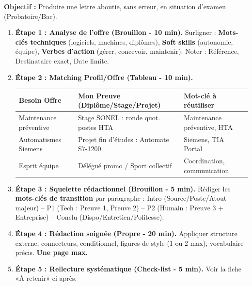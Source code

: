 \documentclass[11pt]{article}
\begin{document}
\begin{methode}
    \textbf{Objectif :} Produire une lettre aboutie, sans erreur, en situation d'examen (Probatoire/Bac).
    \begin{enumerate}
        \item \textbf{Étape 1 : Analyse de l'offre (Brouillon - 10 min).} Surligner : \textbf{Mots-clés techniques} (logiciels, machines, diplômes), \textbf{Soft skills} (autonomie, équipe), \textbf{Verbes d'action} (gérer, concevoir, maintenir). Noter : Référence, Destinataire exact, Date limite.
        \item \textbf{Étape 2 : Matching Profil/Offre (Tableau - 10 min).}
            \begin{center}
            \begin{tabular}{|l|l|l|}\hline
            \textbf{Besoin Offre} & \textbf{Mon Preuve (Diplôme/Stage/Projet)} & \textbf{Mot-clé à réutiliser} \\ \hline
            Maintenance préventive & Stage SONEL : ronde quot. postes HTA & Maintenance préventive, HTA \\ \hline
            Automatismes Siemens & Projet fin d'études : Automate S7-1200 & Siemens, TIA Portal \\ \hline
            Esprit équipe & Délégué promo / Sport collectif & Coordination, communication \\ \hline
            \end{tabular}
            \end{center}
        \item \textbf{Étape 3 : Squelette rédactionnel (Brouillon - 5 min).} Rédiger les \textbf{mots-clés de transition} par paragraphe : Intro (Source/Poste/Atout majeur) -- P1 (Tech : Preuve 1, Preuve 2) -- P2 (Humain : Preuve 3 + Entreprise) -- Conclu (Dispo/Entretien/Politesse).
        \item \textbf{Étape 4 : Rédaction soignée (Propre - 20 min).} Appliquer structure externe, connecteurs, conditionnel, figures de style (1 ou 2 max), vocabulaire précis. \textbf{Une page max.}
        \item \textbf{Étape 5 : Rellecture systématique (Check-list - 5 min).} Voir la fiche «À retenir» ci-après.
    \end{enumerate}
\end{methode}
\end{document}
